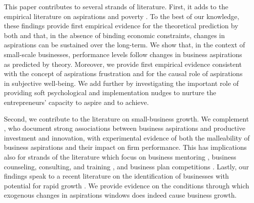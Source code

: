 \documentclass[11.5pt]{article}
\begin{document}
This paper contributes to several strands of literature. First, it adds to the empirical literature on aspirations and poverty \citep[e.g.,][]{Bernard2014, Riley2017, Beaman2012, Janzen2017}. To the best of our knowledge, these findings provide first empirical evidence for the theoretical prediction by both \citet{Genicot2017} and \citet{Dalton2016} that, in the absence of binding economic constraints, changes in aspirations can be sustained over the long-term. We show that, in the context of small-scale businesses, performance levels follow changes in business aspirations as predicted by theory. Moreover, we provide first empirical evidence consistent with the concept of aspirations frustration \citep{Ray2006, Genicot2017} and for the causal role of aspirations in subjective well-being. %
We add further by investigating the important role of providing soft psychological and implementation nudges to nurture the entrepreneurs' capacity to aspire and to achieve. 

Second, we contribute to the literature on small-business growth. We complement \citet{Dalton2018}, who document strong associations between business aspirations and productive investment and innovation, with experimental evidence of both the malleability of business aspirations and their impact on firm performance.%
 This has implications also for strands of the literature which focus on business mentoring \citep[e.g.,][]{Brooks2018, Cai2017}, business counseling, consulting, and training \citep[for reviews see,][]{Carpena2017, McKenzie2014}, and business plan competitions \citep[e.g.,][]{McKenzie2017a, Bjorvatn2015}. Lastly, our findings speak to a recent literature on the identification of businesses with potential for rapid growth \citep[see,][]{Fafchamps2016, Fafchamps2017}. We provide evidence on the conditions through which exogenous changes in aspirations windows does indeed cause business growth. %
\end{document}

